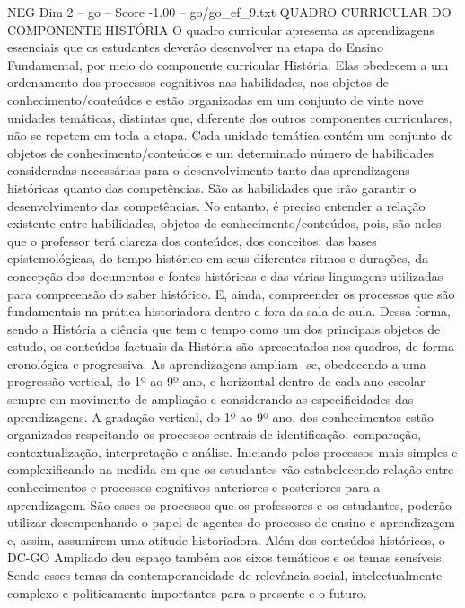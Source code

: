 \begin{textsample}{NEG Dim 2 – go – Score -1.00 – go/go\_ef\_9.txt}  \label{ex:f2_neg_118}
QUADRO CURRICULAR DO COMPONENTE HISTÓRIA O quadro curricular apresenta as aprendizagens essenciais que os estudantes deverão desenvolver na etapa do Ensino Fundamental, por meio do componente curricular História.
Elas obedecem a um ordenamento dos processos cognitivos nas habilidades, nos objetos de conhecimento/conteúdos e estão organizadas em um conjunto de vinte nove unidades temáticas, distintas que, diferente dos outros componentes curriculares, não se repetem em toda a etapa.
Cada unidade temática contém um conjunto de objetos de conhecimento/conteúdos e um determinado número de habilidades consideradas necessárias para o desenvolvimento tanto das aprendizagens históricas quanto das competências.
São as habilidades que irão garantir o desenvolvimento das competências.
No entanto, é preciso entender a relação existente entre habilidades, objetos de conhecimento/conteúdos, pois, são neles que o professor terá clareza dos conteúdos, dos conceitos, das bases epistemológicas, do tempo histórico em seus diferentes ritmos e durações, da concepção dos documentos e fontes históricas e das várias linguagens utilizadas para compreensão do saber histórico.
E, ainda, compreender os processos que são fundamentais na prática historiadora dentro e fora da sala de aula.
Dessa forma, sendo a História a ciência que tem o tempo como um dos principais objetos de estudo, os conteúdos factuais da História são apresentados nos quadros, de forma cronológica e progressiva.
As aprendizagens ampliam -se, obedecendo a uma progressão vertical, do 1º ao 9º ano, e horizontal dentro de cada ano escolar sempre em movimento de ampliação e considerando as especificidades das aprendizagens.
A gradação vertical, do 1º ao 9º ano, dos conhecimentos estão organizados respeitando os processos centrais de identificação, comparação, contextualização, interpretação e análise.
Iniciando pelos processos mais simples e complexificando na medida em que os estudantes vão estabelecendo relação entre conhecimentos e processos cognitivos anteriores e posteriores para a aprendizagem.
São esses os processos que os professores e os estudantes, poderão utilizar desempenhando o papel de agentes do processo de ensino e aprendizagem e, assim, assumirem uma atitude historiadora.
Além dos conteúdos históricos, o DC-GO Ampliado deu espaço também aos eixos temáticos e os temas sensíveis.
Sendo esses temas da contemporaneidade de relevância social, intelectualmente complexo e politicamente importantes para o presente e o futuro.

\end{textsample}
